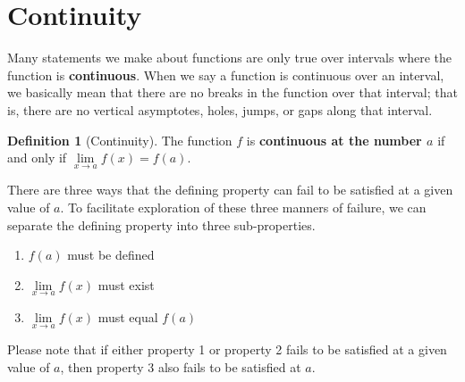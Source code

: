 \documentclass[12pt,]{book}
\newcommand{\terminology}[1]{\textbf{#1}}
\theoremstyle{plain}
\theoremstyle{definition}
\newtheorem{definition}[theorem]{Definition}
\theoremstyle{definition}
\theoremstyle{definition}
\theoremstyle{definition}
\theoremstyle{definition}
\numberwithin{equation}{section}
\newcommand{\fe}[2]{#1\mathopen{}\left(#2\right)\mathclose{}}
\begin{document}
\section[{Continuity}]{Continuity}\label{section-continuity}
Many statements we make about functions are only true over intervals where the function is \terminology{continuous}. When we say a function is continuous over an interval, we basically mean that there are no breaks in the function over that interval; that is, there are no vertical asymptotes, holes, jumps, or gaps along that interval.%
\begin{definition}[{Continuity}]\label{definition-continuity}
The function \(f\) is \terminology{continuous at the number \(a\)} if and only if \(\lim\limits_{x\to a}\fe{f}{x}=\fe{f}{a}\).%
\par
There are three ways that the defining property can fail to be satisfied at a given value of \(a\). To facilitate exploration of these three manners of failure, we can separate the defining property into three sub-properties.%
\leavevmode%
\begin{enumerate}
\item\hypertarget{fofa-is-defined}{}\(\fe{f}{a}\) must be defined%
\item\hypertarget{limfofx-is-defined}{}\(\lim\limits_{x\to a}\fe{f}{x}\) must exist%
\item\hypertarget{limit-equals-value}{}\(\lim\limits_{x\to a}\fe{f}{x}\) must equal \(\fe{f}{a}\)%
\end{enumerate}
\par
Please note that if either property 1 or property 2 fails to be satisfied at a given value of \(a\), then property 3 also fails to be satisfied at \(a\).%
\end{definition}
\typeout{************************************************}
\typeout{************************************************}
\end{document}
